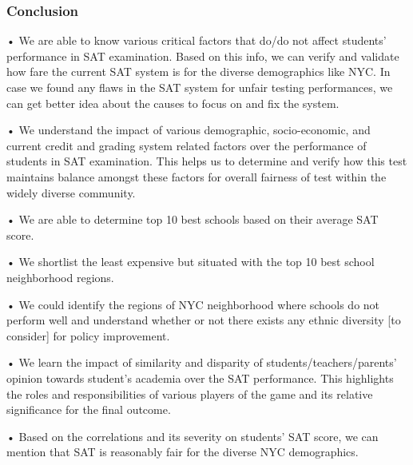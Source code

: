 \documentclass[11pt]{article}
\begin{document}
    \subsubsection{Conclusion}\label{conclusion}
•	We are able to know various critical factors that do/do not affect students’ performance in SAT examination. Based on this info, we can verify and validate how fare the current SAT system is for the diverse demographics like NYC. In case we found any flaws in the SAT system for unfair testing performances, we can get better idea about the causes to focus on and fix the system.

•	We understand the impact of various demographic, socio-economic, and current credit and grading system related factors over the performance of students in SAT examination. This helps us to determine and verify how this test maintains balance amongst these factors for overall fairness of test within the widely diverse community. 

•	We are able to determine top 10 best schools based on their average SAT score.

•	We shortlist the least expensive but situated with the top 10 best school neighborhood regions.

•	We could identify the regions of NYC neighborhood where schools do not perform well and understand whether or not there exists any ethnic diversity [to consider] for policy improvement. 

•	We learn the impact of similarity and disparity of students/teachers/parents’ opinion towards student’s academia over the SAT performance. This highlights the roles and responsibilities of various players of the game and its relative significance for the final outcome.

•	Based on the correlations and its severity on students’ SAT score, we can mention that SAT is reasonably fair for the diverse NYC demographics. 

    
    
    
    
\end{document}
